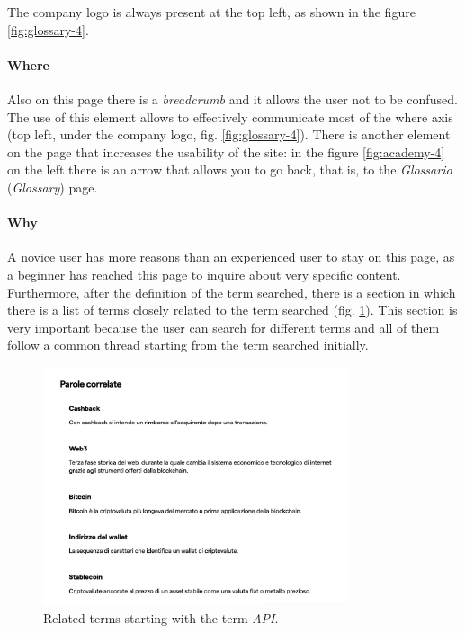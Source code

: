 The company logo is always present at the top left, as shown in the figure 
\ref{fig:glossary-4}.

\paragraph{Where}

Also on this page there is a \textit{breadcrumb} and it allows the user 
not to be confused. The use of this element allows to effectively 
communicate most of the where axis (top left, under the company logo, 
fig. \ref{fig:glossary-4}). There is another element on the page that 
increases the usability of the site: in the figure \ref{fig:academy-4} on 
the left there is an arrow that allows you to go back, that is, to the 
\textit{Glossario} (\textit{Glossary}) page. 

\paragraph{Why}

A novice user has more reasons than an experienced user to stay on this 
page, as a beginner has reached this page to inquire about very specific 
content. Furthermore, after the definition of the term searched, there is 
a section in which there is a list of terms closely related to the term 
searched (fig. \ref{fig:glossary-5}). This section is very important 
because the user can search for different terms and all of them follow a 
common thread starting from the term searched initially. 

\begin{figure}[H]
  \centering
  \includegraphics[width=0.80\textwidth]{res/images/internal-pages/glossary/glossary-5.png}
  \caption{Related terms starting with the term \textit{API}.}
  \label{fig:glossary-5}
\end{figure}

